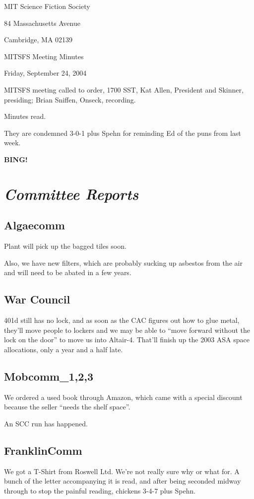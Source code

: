 \documentclass[10pt]{article}
\newcommand{\bing}{{\bf BING!} }
\newcommand{\goto}[1]{\bing \vskip 12pt \section*{{\em{#1}}}}
\newcommand{\ps}{ plus Spehn\xspace}
\begin{document}
\begin{center}

MIT Science Fiction Society 

84 Massachusetts Avenue

Cambridge, MA 02139

\vspace{12pt}

MITSFS Meeting Minutes 

Friday, September 24, 2004

\end{center}
 
\vspace{18pt}

\setlength{\parskip}{6pt}

\noindent
MITSFS meeting called to order, 1700 SST, Kat Allen, President and
Skinner, presiding; Brian Sniffen,  Onseck, recording.

Minutes read.

They are condemned 3-0-1\ps for reminding Ed of the puns from last week.

\goto{Committee Reports}
\subsection*{Algaecomm}
Plant will pick up the bagged tiles soon.

Also, we have new filters, which are probably sucking up asbestos from
the air and will need to be abated in a few years.

\subsection*{War Council}
401d still has no lock, and as soon as the CAC figures out how to
glue metal, they'll move people to lockers and we may be able to
``move forward without the lock on the door'' to move us into
Altair-4.  That'll finish up the 2003 ASA space allocations, only a
year and a half late.

\subsection*{Mobcomm_{1,2,3}}
We ordered a used book through Amazon, which came with a special
discount because the seller ``needs the shelf space''.

An SCC run has happened.

\subsection*{FranklinComm}
We got a T-Shirt from Roswell Ltd.  We're not really sure why or what
for.  A bunch of the letter accompanying it is read, and after being
seconded midway through to stop the painful reading, chickens 3-4-7\ps.
\end{document}
